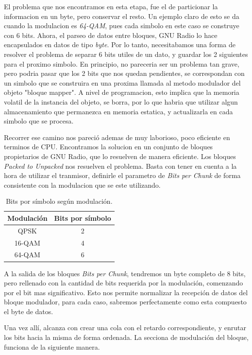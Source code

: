 El problema que nos encontramos en esta etapa, fue el de particionar la informacion en un byte, pero conservar el resto. Un ejemplo claro de esto se da cuando la modulacion es \textit{64-QAM}, pues cada simbolo en este caso se construye con 6 bits. Ahora, el parseo de datos entre bloques, GNU Radio lo hace encapsulados en datos de tipo \textit{byte}. Por lo tanto, necesitabamos una forma de resolver el problema de separar 6 bits utiles de un dato, y guardar los 2 siguientes para el proximo simbolo. En principio, no pareceria ser un problema tan grave, pero podria pasar que los 2 bits que nos quedan pendientes, se correspondan con un simbolo que se construira en una proxima llamada al metodo modulador del objeto "bloque mapper". A nivel de programacion, esto implica que la memoria volatil de la instancia del objeto, se borra, por lo que habria que utilizar algun almacenamiento que permanezca en memoria estatica, y actualizarla en cada simbolo que se procesa.

Recorrer ese camino nos pareció ademas de muy laborioso, poco eficiente en terminos de CPU. Encontramos la solucion en un conjunto de bloques propietarios de GNU Radio, que lo resuelven de manera eficiente. Los bloques \textit{Packed to Unpacked} nos resuelven el problema. Basta con tener en cuenta a la hora de utilizar el tranmisor, definirle el parametro de \textit{Bits per Chunk} de forma consistente con la modulacion que se este utilizando. 

\begin{table}[h!]
	\centering
	\begin{tabular}{|c|c|}
		\hline
		\textbf{Modulación} & \textbf{Bits por símbolo}\\
		\hline
		QPSK		& 2\\
		\hline
		16-QAM 		& 4\\
		\hline
		64-QAM		& 6\\
		\hline
	\end{tabular}
	\caption{\label{Bits por simbolo segun modulacion} Bits por símbolo según modulación.}
\end{table}

A la salida de los bloques \textit{Bits per Chunk}, tendremos un byte completo de 8 bits, pero rellenado con la cantidad de bits requerida por la modulación, comenzando por el bit mas significativo.  Esto nos permite normalizar la recepción de datos del bloque modulador, para cada caso, sabremos perfectamente como esta compuesto el byte de datos. 

Una vez allí, alcanza con crear una cola con el retardo correspondiente, y enrutar los bits hacia la misma de forma ordenada. La secciona de modulación del bloque, funciona de la siguiente manera. 

